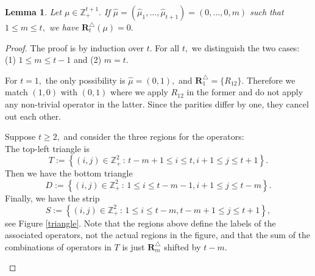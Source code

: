 \documentclass[10pt,a4paper]{amsart}
\newtheorem{lemma}{Lemma}
\begin{document}
\begin{lemma} \label{triangle-lemma}
Let $\mu \in \mathbb{Z}_+^{t+1}.$ If $\hat{\mu}=(\hat{\mu}_1,\ldots,\hat{\mu}_{t+1})=(0,\ldots,0,m)$ such that $1 \leq m \leq t,$ we have $\mathbf{R}^\triangle_{t}(\mu)=0.$ 
\end{lemma}

\begin{proof} The proof is by induction over $t$. For all $t,$ we distinguish the two cases: (1) $1 \leq m \leq t-1$ and (2) $m=t$.

For $t=1,$ the only possibility is $\hat{\mu}=(0,1),$ and $\mathbf{R}^\triangle_1=\{R_{12}\}.$ Therefore we match $(1,0)$ with $(0,1)$ where we apply $R_{12}$ in the former and do not apply any non-trivial operator in the latter. Since the parities differ by one, they cancel out each other. 

Suppose $t\geq 2,$  and consider the three regions for the operators:\\
The top-left triangle is 
\[T:= \left\{ (i,j) \in \mathbb{Z}^2_{+} \, : \,  t-m+1 \leq i \leq t , i+1 \leq j \leq t+1 \right\}.\]
Then we have the bottom triangle
\[D:= \left\{ (i,j) \in \mathbb{Z}^2_{+} \, : \,  1 \leq i \leq t-m-1 , i+1 \leq j \leq t-m \right\}.\]
Finally, we have the strip 
\[S:= \left\{ (i,j) \in \mathbb{Z}^2_{+} \, : \,  1 \leq i \leq t-m , t-m+1 \leq j \leq t+1 \right\},\]
see Figure \ref{triangle}. Note that the regions above define the labels of the associated operators, not the actual regions in the figure, and that the sum of the combinations of operators in $T$ is just $\mathbf{R}_{m}^{\triangle}$ shifted by $t-m$. 

\begin{figure} 
\end{figure}
\end{proof}
\end{document}
